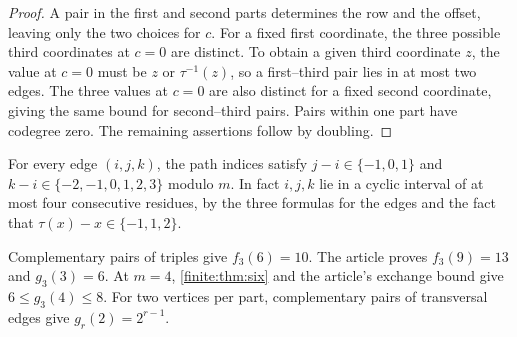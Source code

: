 \documentclass[10pt]{article}
\numberwithin{equation}{section}
\begin{document}
\begin{proof}
A pair in the first and second parts determines the row and the offset, leaving only the two choices for $c$. For a fixed first coordinate, the three possible third coordinates at $c=0$ are distinct. To obtain a given third coordinate $z$, the value at $c=0$ must be $z$ or $\tau^{-1}(z)$, so a first--third pair lies in at most two edges. The three values at $c=0$ are also distinct for a fixed second coordinate, giving the same bound for second--third pairs. Pairs within one part have codegree zero. The remaining assertions follow by doubling.
\end{proof}

For every edge $(i,j,k)$, the path indices satisfy $j-i\in\{-1,0,1\}$ and $k-i\in\{-2,-1,0,1,2,3\}$ modulo $m$. In fact $i,j,k$ lie in a cyclic interval of at most four consecutive residues, by the three formulas for the edges and the fact that $\tau(x)-x\in\{-1,1,2\}$.

Complementary pairs of triples give $f_3(6)=10$. The article proves $f_3(9)=13$ and $g_3(3)=6$. At $m=4$, \cref{finite:thm:six} and the article's exchange bound give $6\le g_3(4)\le8$. For two vertices per part, complementary pairs of transversal edges give $g_r(2)=2^{r-1}$.
\end{document}
